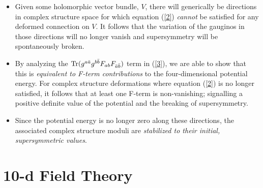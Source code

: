 \documentclass[12pt]{article}
\numberwithin{equation}{section}
\begin{document}
\begin{itemize}
\item Given some holomorphic vector bundle, $V$, there will generically be directions in complex structure space for which equation (\ref{2}) {\it cannot} be satisfied for any deformed connection on $V$. It follows that the variation of the gauginos in those directions will no longer vanish and supersymmetry will be spontaneously broken.

\item By analyzing the ${\rm Tr}(g^{a{\bar{a}}} g^{b{\bar{b}}} F_{ab}F_{{\bar{a}}{\bar{b}}})$ term in (\ref{3}), we are able to show  that this is {\it equivalent to F-term contributions} to the four-dimensional potential energy. For complex structure deformations where equation (\ref{2}) is no longer satisfied, it follows that at least one F-term is non-vanishing; signalling a positive definite value of the potential and the breaking of supersymmetry.

\item Since the potential energy is no longer zero along these directions, the associated complex structure moduli are {\it stabilized to their initial, supersymmetric values}.
\end{itemize}

\section{10-d Field Theory}
\end{document}
